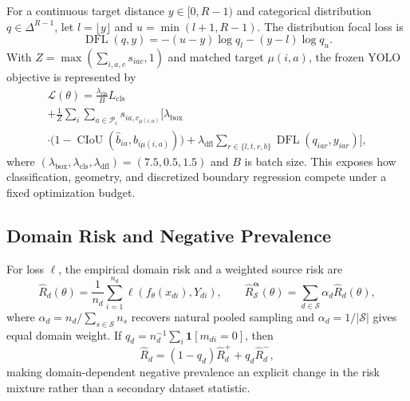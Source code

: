 \documentclass[conference]{ieee-template/vendor/IEEEtran/IEEEtran}
\begin{document}
For a continuous target distance $y\in[0,R-1)$ and categorical distribution
$q\in\Delta^{R-1}$, let $l=\lfloor y\rfloor$ and
$u=\min(l+1,R-1)$. The
distribution focal loss is
\begin{equation}
 \operatorname{DFL}(q,y)=-(u-y)\log q_l-(y-l)\log q_u.
 \label{eq:dfl}
\end{equation}
With $Z=\max(\sum_{i,a,c}s_{iac},1)$ and matched target $\mu(i,a)$, the frozen
YOLO objective is represented by
\begin{multline}
 \mathcal L(\theta)=\frac{\lambda_{\mathrm{cls}}}{B}L_{\mathrm{cls}}\\
 +\frac{1}{Z}\sum_i\sum_{a\in\mathcal P_i}
 s_{ia,c_{\mu(i,a)}}\Bigg[\lambda_{\mathrm{box}}\\
 \cdot\bigl(1-\operatorname{CIoU}(
 \hat b_{ia},b_{i\mu(i,a)})\bigr)
 +\lambda_{\mathrm{dfl}}\sum_{r\in\{l,t,r,b\}}
 \operatorname{DFL}(q_{iar},y_{iar})\Bigg],
 \label{eq:yolo-loss}
\end{multline}
where $(\lambda_{\mathrm{box}},\lambda_{\mathrm{cls}},
\lambda_{\mathrm{dfl}})=(7.5,0.5,1.5)$ and $B$ is batch size. This exposes how
classification, geometry, and discretized boundary regression compete under a
fixed optimization budget.

\subsection{Domain Risk and Negative Prevalence}
For loss $\ell$, the empirical domain risk and a weighted source risk are
\begin{equation}
 \widehat R_d(\theta)=\frac{1}{n_d}\sum_{i=1}^{n_d}
 \ell(f_\theta(x_{di}),Y_{di}),\qquad
 \widehat R_{\mathcal S}^{\boldsymbol\alpha}(\theta)=
 \sum_{d\in\mathcal S}\alpha_d\widehat R_d(\theta),
 \label{eq:domain-risk}
\end{equation}
where $\alpha_d=n_d/\sum_{s\in\mathcal S}n_s$ recovers natural pooled sampling
and $\alpha_d=1/|\mathcal S|$ gives equal domain weight. If
$q_d=n_d^{-1}\sum_i\mathbf 1[m_{di}=0]$, then
\begin{equation}
 \widehat R_d=(1-q_d)\widehat R_d^+ +q_d\widehat R_d^-,
 \label{eq:negative-risk}
\end{equation}
making domain-dependent negative prevalence an explicit change in the risk
mixture rather than a secondary dataset statistic.
\end{document}
